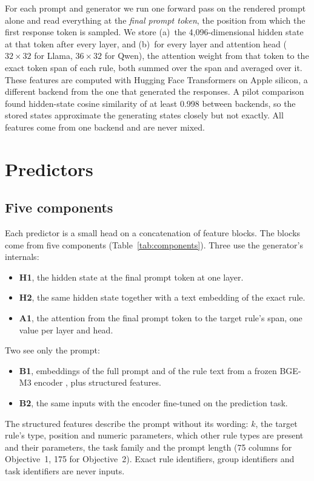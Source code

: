 \documentclass[10pt]{article}
\begin{document}
For each prompt and generator we run one forward pass on the rendered prompt alone and read everything at the
\emph{final prompt token}, the position from which the first response token is sampled. We store (a)~the
4,096-dimensional hidden state at that token after every layer, and (b)~for every layer and attention head
($32\times32$ for Llama, $36\times32$ for Qwen), the attention weight from that token to the exact token span of each
rule, both summed over the span and averaged over it. These features are computed with Hugging Face Transformers on
Apple silicon, a different backend from the one that generated the responses. A pilot comparison found hidden-state
cosine similarity of at least 0.998 between backends, so the stored states approximate the generating states closely
but not exactly. All features come from one backend and are never mixed.

\section{Predictors}
\label{sec:predictors}

\subsection{Five components}

Each predictor is a small head on a concatenation of feature blocks. The blocks come from five components
(Table~\ref{tab:components}). Three use the generator's internals:
\begin{itemize}
\item \textbf{H1}, the hidden state at the final prompt token at one layer.
\item \textbf{H2}, the same hidden state together with a text embedding of the exact rule.
\item \textbf{A1}, the attention from the final prompt token to the target rule's span, one value per layer and head.
\end{itemize}
Two see only the prompt:
\begin{itemize}
\item \textbf{B1}, embeddings of the full prompt and of the rule text from a frozen BGE-M3 encoder
\citep{chen2024bge}, plus structured features.
\item \textbf{B2}, the same inputs with the encoder fine-tuned on the prediction task.
\end{itemize}
The structured features describe the prompt without its wording: $k$, the target rule's type, position and numeric
parameters, which other rule types are present and their parameters, the task family and the prompt length (75 columns
for Objective~1, 175 for Objective~2). Exact rule identifiers, group identifiers and task identifiers are never inputs.
\end{document}
